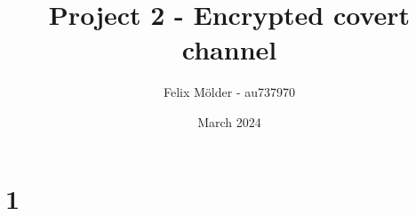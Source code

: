 \documentclass{article}
\title{Project 2 - Encrypted covert channel}
\author{Felix Mölder - au737970}
\date{March 2024}
\begin{document}
\maketitle

\section{1}
\end{document}
